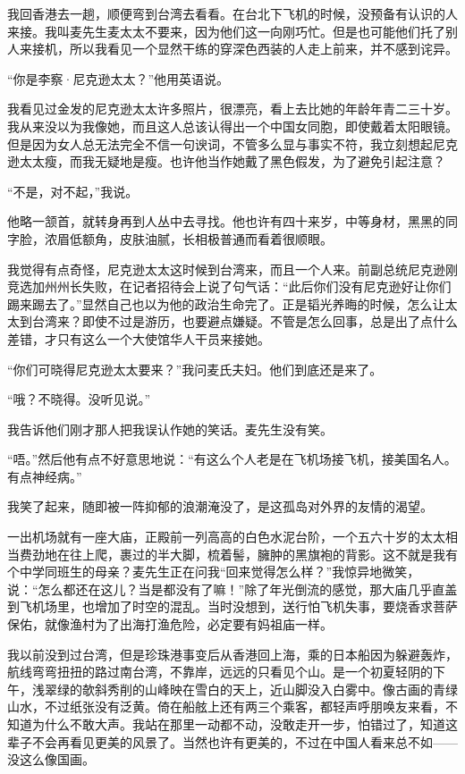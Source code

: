 \par 我回香港去一趟，顺便弯到台湾去看看。在台北下飞机的时候，没预备有认识的人来接。我叫麦先生麦太太不要来，因为他们这一向刚巧忙。但是也可能他们托了别人来接机，所以我看见一个显然干练的穿深色西装的人走上前来，并不感到诧异。
\par “你是李察·尼克逊太太？”他用英语说。
\par 我看见过金发的尼克逊太太许多照片，很漂亮，看上去比她的年龄年青二三十岁。我从来没以为我像她，而且这人总该认得出一个中国女同胞，即使戴着太阳眼镜。但是因为女人总无法完全不信一句谀词，不管多么显与事实不符，我立刻想起尼克逊太太瘦，而我无疑地是瘦。也许他当作她戴了黑色假发，为了避免引起注意？
\par “不是，对不起，”我说。
\par 他略一颔首，就转身再到人丛中去寻找。他也许有四十来岁，中等身材，黑黑的同字脸，浓眉低额角，皮肤油腻，长相极普通而看着很顺眼。
\par 我觉得有点奇怪，尼克逊太太这时候到台湾来，而且一个人来。前副总统尼克逊刚竞选加州州长失败，在记者招待会上说了句气话：“此后你们没有尼克逊好让你们踢来踢去了。”显然自己也以为他的政治生命完了。正是韬光养晦的时候，怎么让太太到台湾来？即使不过是游历，也要避点嫌疑。不管是怎么回事，总是出了点什么差错，才只有这么一个大使馆华人干员来接她。
\par “你们可晓得尼克逊太太要来？”我问麦氏夫妇。他们到底还是来了。
\par “哦？不晓得。没听见说。”
\par 我告诉他们刚才那人把我误认作她的笑话。麦先生没有笑。
\par “唔。”然后他有点不好意思地说：“有这么个人老是在飞机场接飞机，接美国名人。有点神经病。”
\par 我笑了起来，随即被一阵抑郁的浪潮淹没了，是这孤岛对外界的友情的渴望。
\par 一出机场就有一座大庙，正殿前一列高高的白色水泥台阶，一个五六十岁的太太相当费劲地在往上爬，裹过的半大脚，梳着髻，臃肿的黑旗袍的背影。这不就是我有个中学同班生的母亲？麦先生正在问我“回来觉得怎么样？”我惊异地微笑，说：“怎么都还在这儿？当是都没有了嘛！”除了年光倒流的感觉，那大庙几乎直盖到飞机场里，也增加了时空的混乱。当时没想到，送行怕飞机失事，要烧香求菩萨保佑，就像渔村为了出海打渔危险，必定要有妈祖庙一样。
\par 我以前没到过台湾，但是珍珠港事变后从香港回上海，乘的日本船因为躲避轰炸，航线弯弯扭扭的路过南台湾，不靠岸，远远的只看见个山。是一个初夏轻阴的下午，浅翠绿的欹斜秀削的山峰映在雪白的天上，近山脚没入白雾中。像古画的青绿山水，不过纸张没有泛黄。倚在船舷上还有两三个乘客，都轻声呼朋唤友来看，不知道为什么不敢大声。我站在那里一动都不动，没敢走开一步，怕错过了，知道这辈子不会再看见更美的风景了。当然也许有更美的，不过在中国人看来总不如——没这么像国画。

